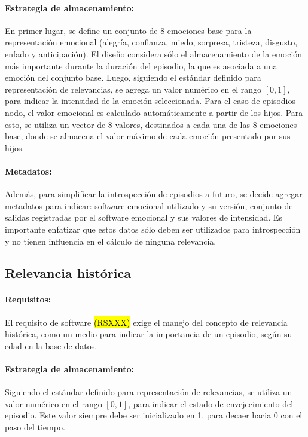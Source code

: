 \paragraph{Estrategia de almacenamiento:}
En primer lugar, se define un conjunto de 8 emociones base para la representación emocional (alegría, confianza, miedo, sorpresa, tristeza, disgusto, enfado y anticipación). El diseño considera sólo el almacenamiento de la emoción más importante durante la duración del episodio, la que es asociada a una emoción del conjunto base. Luego, siguiendo el estándar definido para representación de relevancias, se agrega un valor numérico en el rango $[0, 1]$, para  indicar la intensidad de la emoción seleccionada. Para el caso de episodios nodo, el valor emocional es calculado automáticamente a partir de los hijos. Para esto, se utiliza un vector de 8 valores, destinados a cada una de las 8 emociones base, donde se almacena el valor máximo de cada emoción presentado por sus hijos.

\paragraph{Metadatos:}
Además, para simplificar la introspección de episodios a futuro, se decide agregar metadatos para indicar: software emocional utilizado y su versión, conjunto de salidas registradas por el software emocional y sus valores de intensidad. Es importante enfatizar que estos datos sólo deben ser utilizados para introspección y no tienen influencia en el cálculo de ninguna relevancia.



\subsection{Relevancia histórica}

\paragraph{Requisitos:}
El requisito de software \hl{(RSXXX)} exige el manejo del concepto de relevancia histórica, como un medio para indicar la importancia de un episodio, según su edad en la base de datos. 

\paragraph{Estrategia de almacenamiento:}
Siguiendo el estándar definido para representación de relevancias, se utiliza un valor numérico en el rango $[0, 1]$, para  indicar el estado de envejecimiento del episodio. Este valor siempre debe ser inicializado en 1, para decaer hacia 0 con el paso del tiempo.


